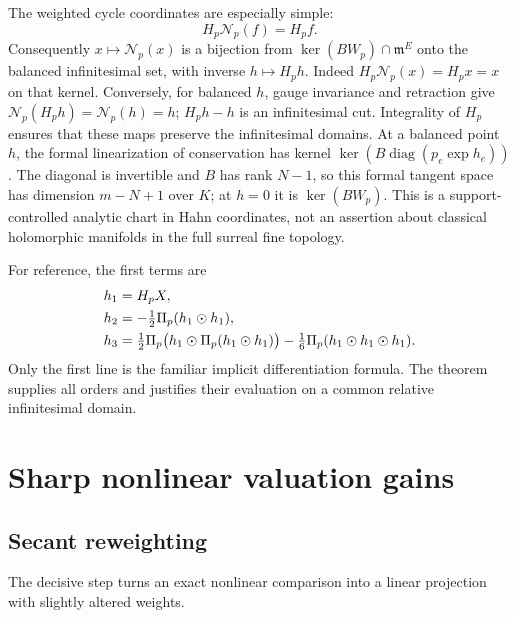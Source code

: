 \documentclass[11pt,a4paper]{article}
\numberwithin{equation}{section}
\theoremstyle{definition}
\newcommand{\mm}{\mathfrak m}
\newcommand{\NN}{\mathcal N}
\newcommand{\diag}{\operatorname{diag}}
\newcommand{\od}{\mathbin{\odot}}
\begin{document}
The weighted cycle coordinates are especially simple:
\begin{equation}\label{scale:eq:cyclechart}
 H_p\NN_p(f)=H_pf.
\end{equation}
Consequently $x\mapsto\NN_p(x)$ is a bijection from
$\ker(BW_p)\cap\mm^E$ onto the balanced infinitesimal set, with
inverse $h\mapsto H_ph$. Indeed $H_p\NN_p(x)=H_px=x$ on that
kernel. Conversely, for balanced $h$, gauge invariance and retraction give
$\NN_p(H_ph)=\NN_p(h)=h$; $H_ph-h$ is an infinitesimal cut.
Integrality of $H_p$ ensures that these maps preserve the infinitesimal
domains. At a balanced point $h$, the formal
linearization of conservation has kernel
$\ker(B\diag(p_e\exp h_e))$. The diagonal is invertible and $B$
has rank $N-1$, so this formal tangent space has dimension $m-N+1$
over $K$; at $h=0$ it is $\ker(BW_p)$. This is a support-controlled analytic chart in
Hahn coordinates, not an assertion about classical holomorphic
manifolds in the full surreal fine topology.

For reference, the first terms are
\begin{align}
 h_1&=H_pX,\notag\\
 h_2&=-\tfrac12\Pi_p(h_1\od h_1),\label{scale:eq:firstterms}\\
 h_3&=\tfrac12\Pi_p\bigl(h_1\od\Pi_p(h_1\od h_1)\bigr)
       -\tfrac16\Pi_p(h_1\od h_1\od h_1).\notag
\end{align}
Only the first line is the familiar implicit differentiation formula.
The theorem supplies all orders and justifies their evaluation on a
common relative infinitesimal domain.

\section{Sharp nonlinear valuation gains}\label{scale:sec:gain}

\subsection{Secant reweighting}
The decisive step turns an exact nonlinear comparison into a linear
projection with slightly altered weights.
\end{document}
